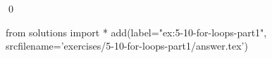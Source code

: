 
\begin{ex}
  \label{ex:5-10-for-loops-part1}
  
  \qed
\end{ex}
\begin{python0}
from solutions import *
add(label="ex:5-10-for-loops-part1",
    srcfilename='exercises/5-10-for-loops-part1/answer.tex')
\end{python0}
